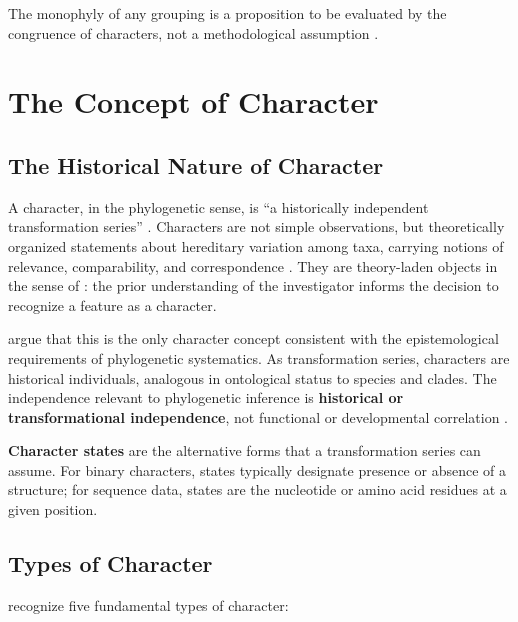 The monophyly of any grouping is a proposition to be evaluated by the congruence of characters, not a methodological assumption \parencite{nixon1993}.

\section{The Concept of Character}
\label{sec:caracteres}

\subsection{The Historical Nature of Character}

A character, in the phylogenetic sense, is ``a historically independent transformation series'' \parencite[p.~333]{wheeleretal2006}. Characters are not simple observations, but theoretically organized statements about hereditary variation among taxa, carrying notions of relevance, comparability, and correspondence \parencite{wheeler2012}. They are theory-laden objects in the sense of \textcite{popper1959}: the prior understanding of the investigator informs the decision to recognize a feature as a character.

\textcite{grant2004ts} argue that this is the only character concept consistent with the epistemological requirements of phylogenetic systematics. As transformation series, characters are historical individuals, analogous in ontological status to species and clades. The independence relevant to phylogenetic inference is \textbf{historical or transformational independence}, not functional or developmental correlation \parencite{grant2004ts}.

\textbf{Character states} are the alternative forms that a transformation series can assume. For binary characters, states typically designate presence or absence of a structure; for sequence data, states are the nucleotide or amino acid residues at a given position.

\subsection{Types of Character}

\textcite{wheeleretal2006} recognize five fundamental types of character:

